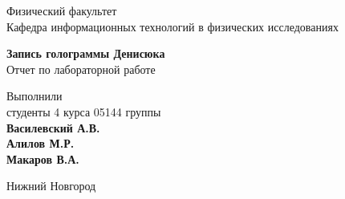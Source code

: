 

\makeatletter
\begin{titlepage}
	
	\newpage
	
    \noindent{}
    
	\vspace*{50pt}
    
	Физический факультет \\[\baselineskip]
    
	Кафедра информационных технологий в физических исследованиях

	\vspace*{100pt}

	{\Large\textbf{Запись голограммы Денисюка}} \\[\baselineskip]

	Отчет по лабораторной работе

	\vspace*{\fill}

	\hfill\begin{minipage}{15em}
    	Выполнили\\
		студенты 4 курса 05144 группы\\
		\textbf{Василевский А.В.}\\
		\textbf{Алилов М.Р.}\\
		\textbf{Макаров В.А.}
    \end{minipage}
    
	
    
	\vspace*{\fill}
    
	Нижний Новгород\par
    
	
\end{titlepage}
\makeatother